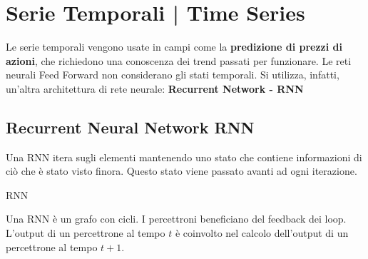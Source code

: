 \section{Serie Temporali | Time Series}
\label{sec:time-series}

Le serie temporali vengono usate in campi come la \textbf{predizione di prezzi
    di azioni}, che richiedono una conoscenza dei trend passati per funzionare. Le
reti neurali Feed Forward non considerano gli stati temporali. Si utilizza,
infatti, un'altra architettura di rete neurale: \textbf{Recurrent Network -
    RNN}

\subsection{Recurrent Neural Network RNN}

Una RNN itera sugli elementi mantenendo uno stato che contiene informazioni di
ciò che è stato visto finora. Questo stato viene passato avanti ad ogni
iterazione.

\begin{definition} RNN

\end{definition}

Una RNN è un grafo con cicli. I percettroni beneficiano del feedback dei loop.
L'output di un percettrone al tempo $t$ è coinvolto nel calcolo dell'output di
un percettrone al tempo $t+1$.

\begin{figure}[H]
    \begin{center}
    \end{center}
\end{figure}

\begin{figure}[H]
    \begin{center}
    \end{center}
\end{figure}

